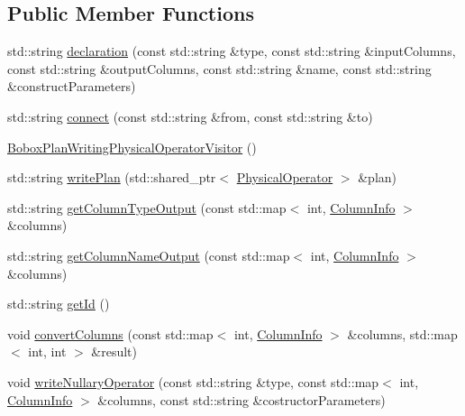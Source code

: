 \subsection*{Public Member Functions}
\begin{DoxyCompactItemize}
\item 
std\+::string \hyperlink{class_bobox_plan_writing_physical_operator_visitor_a67767e3ad079b9fd8d431c230aed3f73}{declaration} (const std\+::string \&type, const std\+::string \&input\+Columns, const std\+::string \&output\+Columns, const std\+::string \&name, const std\+::string \&construct\+Parameters)
\item 
std\+::string \hyperlink{class_bobox_plan_writing_physical_operator_visitor_a9dc928a4e3a478c260036bbc44daf302}{connect} (const std\+::string \&from, const std\+::string \&to)
\item 
\hyperlink{class_bobox_plan_writing_physical_operator_visitor_a77c03666c41cd9a0db08dc5681fd1512}{Bobox\+Plan\+Writing\+Physical\+Operator\+Visitor} ()
\item 
std\+::string \hyperlink{class_bobox_plan_writing_physical_operator_visitor_ad19fe61538f80b821617614a31e30cb2}{write\+Plan} (std\+::shared\+\_\+ptr$<$ \hyperlink{class_physical_operator}{Physical\+Operator} $>$ \&plan)
\item 
std\+::string \hyperlink{class_bobox_plan_writing_physical_operator_visitor_a09857e8ac9d485ca1a749e06fd447a4a}{get\+Column\+Type\+Output} (const std\+::map$<$ int, \hyperlink{class_column_info}{Column\+Info} $>$ \&columns)
\item 
std\+::string \hyperlink{class_bobox_plan_writing_physical_operator_visitor_ab10127e63906b7eb061f703cd7bb9252}{get\+Column\+Name\+Output} (const std\+::map$<$ int, \hyperlink{class_column_info}{Column\+Info} $>$ \&columns)
\item 
std\+::string \hyperlink{class_bobox_plan_writing_physical_operator_visitor_aa41f0bb800a4584a5d2baa160f3b064a}{get\+Id} ()
\item 
void \hyperlink{class_bobox_plan_writing_physical_operator_visitor_a809cf16afde7b5714466438602925355}{convert\+Columns} (const std\+::map$<$ int, \hyperlink{class_column_info}{Column\+Info} $>$ \&columns, std\+::map$<$ int, int $>$ \&result)
\item 
void \hyperlink{class_bobox_plan_writing_physical_operator_visitor_a3d0b2c26562a904deac5d003eee02faf}{write\+Nullary\+Operator} (const std\+::string \&type, const std\+::map$<$ int, \hyperlink{class_column_info}{Column\+Info} $>$ \&columns, const std\+::string \&costructor\+Parameters)

\end{DoxyCompactItemize}
